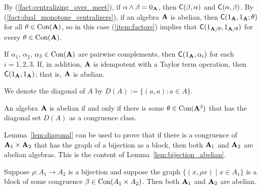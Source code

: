 \begin{remark}
By (\ref{fact:centralizing_over_meet}), 
if $\alpha \wedge \beta = 0_{\mathbf{A}}$,  
then $\mathsf{C}(\beta, \alpha)$ and $\mathsf{C}(\alpha, \beta)$.
By (\ref{fact:dual_monotone_centralizers}),
if an algebra $\mathbf{A}$ is abelian, 
then $\mathsf{C}(1_{\mathbf{A}}, 1_{\mathbf{A}}; \theta)$ for all $\theta \in \operatorname{Con}(\mathbf{A})$, so
in this case (\ref{item:factors}) implies that $\mathsf{C}(1_{\mathbf{A}/\theta}, 1_{\mathbf{A}/\theta})$ for every $\theta \in \operatorname{Con}(\mathbf{A})$.
\end{remark}


\begin{lemma}
\label{lem:M3-abelian}
If $\alpha_1$, $\alpha_2$, $\alpha_3 \in \operatorname{Con}(\mathbf{A})$ are pairwise complements,
then $\mathsf{C}(1_{\mathbf{A}}, \alpha_i)$ for each $i=1,2,3$.  If, in addition, $\mathbf{A}$ is
idempotent with a Taylor term operation, then $\mathsf{C}(1_{\mathbf{A}}, 1_{\mathbf{A}})$; that is, $\mathbf{A}$ is abelian.
\end{lemma}

We denote the diagonal of $A$ by $D(A) := \{(a,a): a \in A\}$. 
\begin{lemma}
\label{lem:diagonal}
An algebra $\mathbf{A}$ is abelian if and only if there is some $\theta \in \operatorname{Con} (\mathbf{A}^2)$ that has
the diagonal set $D(A)$ as a congruence class.
\end{lemma}

Lemma~\ref{lem:diagonal} can be used to prove that if there is 
a congruence of $\mathbf{A}_1 \times \mathbf{A}_2$ that has the graph of a bijection as a
block, then both $\mathbf{A}_1$ and $\mathbf{A}_2$ are abelian algebras.  This is the content of 
Lemma~\ref{lem:bijection_abelian}. 
\begin{lemma}
  \label{lem:bijection_abelian}
Suppose $\rho: A_1 \to A_2$ is a bijection and suppose the graph
$\{(x, \rho x) \mid x \in A_1\}$ is a block of some congruence
$\beta \in \operatorname{Con} (A_1 \times A_2)$.  Then both $\mathbf{A}_1$ and $\mathbf{A}_2$ are abelian.
\end{lemma}

